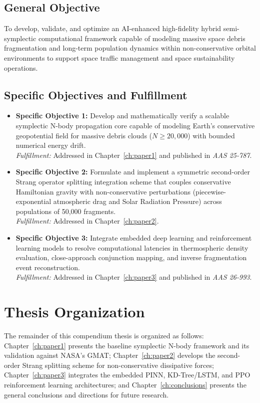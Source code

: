 \documentclass[12pt,letterpaper,twoside]{book}
\begin{document}
\subsection{General Objective}
To develop, validate, and optimize an AI-enhanced high-fidelity hybrid semi-symplectic computational framework capable of modeling massive space debris fragmentation and long-term population dynamics within non-conservative orbital environments to support space traffic management and space sustainability operations.

\subsection{Specific Objectives and Fulfillment}
\begin{itemize}
    \item \textbf{Specific Objective 1:} Develop and mathematically verify a scalable symplectic N-body propagation core capable of modeling Earth's conservative geopotential field for massive debris clouds ($N \ge 20,000$) with bounded numerical energy drift. \\
    \textit{Fulfillment:} Addressed in Chapter~\ref{ch:paper1} and published in \textit{AAS 25-787}.
    
    \item \textbf{Specific Objective 2:} Formulate and implement a symmetric second-order Strang operator splitting integration scheme that couples conservative Hamiltonian gravity with non-conservative perturbations (piecewise-exponential atmospheric drag and Solar Radiation Pressure) across populations of 50,000 fragments. \\
    \textit{Fulfillment:} Addressed in Chapter~\ref{ch:paper2}.
    
    \item \textbf{Specific Objective 3:} Integrate embedded deep learning and reinforcement learning models to resolve computational latencies in thermospheric density evaluation, close-approach conjunction mapping, and inverse fragmentation event reconstruction. \\
    \textit{Fulfillment:} Addressed in Chapter~\ref{ch:paper3} and published in \textit{AAS 26-993}.
\end{itemize}

\section{Thesis Organization}
The remainder of this compendium thesis is organized as follows: Chapter~\ref{ch:paper1} presents the baseline symplectic N-body framework and its validation against NASA's GMAT; Chapter~\ref{ch:paper2} develops the second-order Strang splitting scheme for non-conservative dissipative forces; Chapter~\ref{ch:paper3} integrates the embedded PINN, KD-Tree/LSTM, and PPO reinforcement learning architectures; and Chapter~\ref{ch:conclusions} presents the general conclusions and directions for future research.
\end{document}
